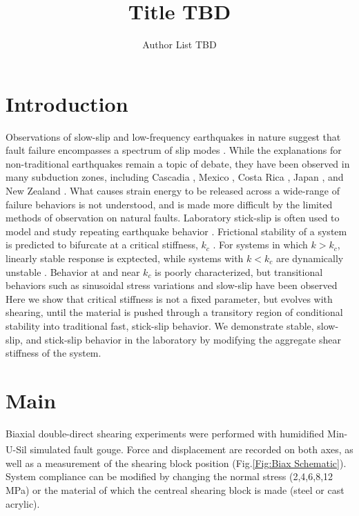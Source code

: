 \documentclass[11pt]{article}
\title{Title TBD}
\author{Author List TBD}
\date{} %
\begin{document}
\maketitle

\section{Introduction}
Observations of slow-slip and low-frequency earthquakes in nature suggest that
fault failure encompasses a spectrum of slip modes \cite{Peng:2010, Ide:2007,
Beroza:2011}.  While the explanations for non-traditional earthquakes remain a
topic of debate, they have been observed in many subduction zones, including
Cascadia \cite{Miller:2002, Rogers:2003}, Mexico \cite{Kostoglodov:2003}, Costa
Rica \cite{Jiang:2012}, Japan \cite{Ito:2006}, and New Zealand
\cite{Wallace:2010}. What causes strain energy to be released across a
wide-range of failure behaviors is not understood, and is made more difficult by
the limited methods of observation on natural faults. Laboratory stick-slip is
often used to model and study repeating earthquake behavior \cite{Brace:1966,
Johnson:2013}. Frictional stability of a system is predicted to bifurcate at a
critical stiffness, $k_c$ \cite{Gu:1984}. For systems in which $k>k_c$,
linearly stable response is exptected, while systems with $k<k_c$ are
dynamically unstable \cite{Scholz:2002}. Behavior at and near $k_c$ is poorly
characterized, but transitional behaviors such as sinusoidal stress variations and
slow-slip have been observed \cite{Kaproth:2013, Baumberger:1994, Leeman:2015}
Here we show that critical stiffness is not a fixed parameter, but evolves with
shearing, until the material is pushed through a transitory region of conditional
stability into traditional fast, stick-slip behavior. We demonstrate stable,
slow-slip, and stick-slip behavior in the laboratory by modifying the aggregate
shear stiffness of the system.

\section{Main}
Biaxial double-direct shearing experiments were performed with humidified
Min-U-Sil\textsuperscript{\textregistered} simulated fault gouge. Force and
displacement are recorded on both axes, as well as a measurement of the shearing
block position (Fig.\ref{Fig:Biax Schematic}). System compliance can be modified
by changing the normal stress (2,4,6,8,12 MPa) or the material of which the
centreal shearing block is made (steel or cast acrylic).
\end{document}
